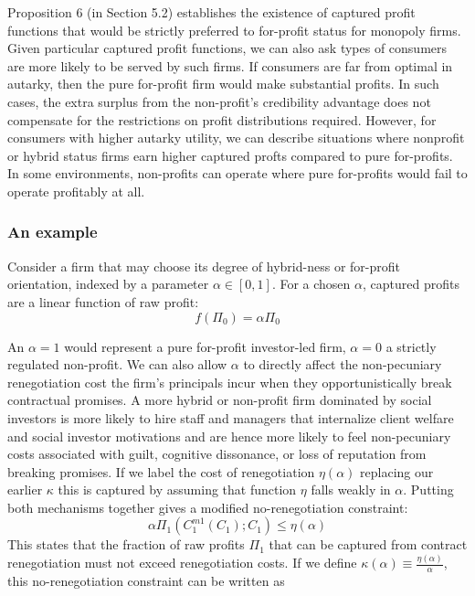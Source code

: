 \documentclass[11pt,english]{article}
\theoremstyle{plain}
\theoremstyle{definition}
\begin{document}
 Proposition 6 (in Section 5.2) establishes the
existence of captured profit functions that would be strictly preferred
to for-profit status for monopoly firms. 
Given particular captured profit functions, we can also ask types of
consumers are more likely to be served by such firms. If
consumers are far from optimal in autarky, then the pure for-profit firm
would make substantial profits. In such cases, the extra surplus from the non-profit's
credibility advantage does not compensate for the  restrictions on profit distributions required.
 However, for consumers with higher autarky utility, we can describe situations where nonprofit or hybrid status firms earn higher captured profts compared to pure for-profits. In some environments, non-profits can operate where pure for-profits would fail to operate profitably at all.
\subsubsection{An example}

Consider a firm that may choose its degree of
hybrid-ness or for-profit orientation, indexed by a parameter $\alpha\in\left[0,1\right]$.
For a chosen $\alpha$, captured profits are a linear function of raw profit:
\begin{equation}
f\left(\Pi_{0}\right)=\alpha\Pi_{0}
\end{equation}

An $\alpha=1$
would represent a pure for-profit investor-led firm, $\alpha=0$ a
strictly regulated non-profit.
We can also allow $\alpha$ to directly affect the non-pecuniary renegotiation
cost the firm's principals incur when they opportunistically break
contractual promises. A more hybrid or non-profit firm
dominated by social investors is more likely to hire staff and managers
that internalize client welfare and social investor motivations and
are hence more likely to feel non-pecuniary costs associated with
guilt, cognitive dissonance, or loss of reputation from breaking promises. If we label the cost of renegotiation $\eta\left(\alpha\right)$ \textendash{}
replacing our earlier $\kappa$ \textendash{} this is captured
by assuming that function $\eta$ falls weakly in $\alpha$. Putting
both mechanisms together gives a modified no-renegotiation constraint: 
\begin{equation}
\alpha\Pi_{1}(C_{1}^{m1}(C_{1});C_{1})\leq\eta(\alpha)\label{eq:no_reneg_np}
\end{equation}
This states that the fraction of raw profits
$\Pi_{1}$ that can be captured from  contract renegotiation must
not exceed renegotiation costs. If we define $\kappa(\alpha)\equiv\frac{\eta(\alpha)}{\alpha}$, this
no-renegotiation constraint can be written as
\end{document}
